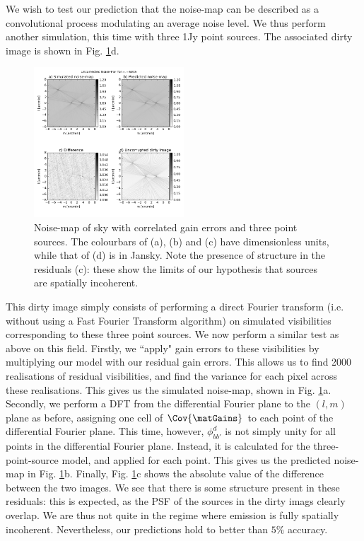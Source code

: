 \pg
{We wish to test our prediction that the noise-map can be described as a convolutional process modulating an average noise level. We thus perform another simulation, this time with three 1Jy point sources. The associated dirty image is shown in Fig. \ref{imag.simu-3sources.noisemap}d. }

\begin{figure}[t!]
\centering
\includegraphics[width=0.5\textwidth]{images/Ctime6400-noisePSFandDirty-uncorr.png}
\caption{\label{imag.simu-3sources.noisemap} {Noise-map of sky with correlated gain errors and three point sources. The colourbars of (a), (b) and (c) have dimensionless units, while that of (d) is in Jansky. Note the presence of structure in the residuals (c): these show the limits of our hypothesis that sources are spatially incoherent.}}
\end{figure}


\pg
{This dirty image simply consists of performing a direct Fourier transform (i.e. without using a Fast Fourier Transform algorithm) on simulated visibilities corresponding to these three point sources. We now perform a similar test as above on this field. Firstly, we ``apply" gain errors to these visibilities by multiplying our model with our residual gain errors. This allows us to find 2000 realisations of residual visibilities, and find the variance for each pixel across these realisations. This gives us the simulated noise-map, shown in Fig. \ref{imag.simu-3sources.noisemap}a. Secondly, we perform a DFT from the differential Fourier plane to the $(l,m)$ plane as before, assigning one cell of $\Cov{\matGains}$ to each point of the differential Fourier plane. This time, however, $\phi_{bb'}^d$ is not simply unity for all points in the differential Fourier plane. Instead, it is calculated for the three-point-source model, and applied for each point. This gives us the predicted noise-map in Fig. \ref{imag.simu-3sources.noisemap}b. Finally, Fig. \ref{imag.simu-3sources.noisemap}c shows the absolute value of the difference between the two images. We see that there is some structure present in these residuals: this is expected, as the PSF of the sources in the dirty imags clearly overlap. We are thus not quite in the regime where emission is fully spatially incoherent. Nevertheless, our predictions hold to better than $5\%$ accuracy. }




